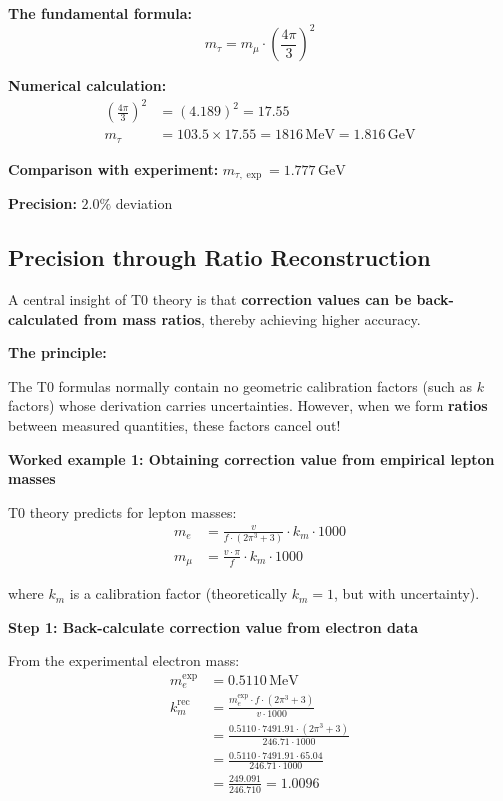 	\textbf{The fundamental formula:}
	\begin{equation}
		\boxed{m_\tau = m_\mu \cdot \left(\frac{4\pi}{3}\right)^2}
	\end{equation}
	
	\textbf{Numerical calculation:}
	\begin{align}
		\left(\frac{4\pi}{3}\right)^2 &= (4.189)^2 = 17.55 \\
		m_\tau &= 103.5 \times 17.55 = 1816\,\text{MeV} = 1.816\,\text{GeV}
	\end{align}
	
	\textbf{Comparison with experiment:} \(m_{\tau,\exp} = 1.777\,\text{GeV}\)
	
	\textbf{Precision:} \(2.0\%\) deviation
	
	\subsection{Precision through Ratio Reconstruction}
	
	A central insight of T0 theory is that \textbf{correction values can be back-calculated from mass ratios}, thereby achieving higher accuracy.
	
	\textbf{The principle:}
	
	The T0 formulas normally contain no geometric calibration factors (such as \(k\) factors) whose derivation carries uncertainties. However, when we form \textbf{ratios} between measured quantities, these factors cancel out!
	
	\textbf{Worked example 1: Obtaining correction value from empirical lepton masses}
	
	T0 theory predicts for lepton masses:
	\begin{align}
		m_e &= \frac{v}{f \cdot (2\pi^3 + 3)} \cdot k_m \cdot 1000 \\
		m_\mu &= \frac{v \cdot \pi}{f} \cdot k_m \cdot 1000
	\end{align}
	
	where \(k_m\) is a calibration factor (theoretically \(k_m = 1\), but with uncertainty).
	
	\textbf{Step 1: Back-calculate correction value from electron data}
	
	From the experimental electron mass:
	\begin{align}
		m_e^{\exp} &= 0.5110\,\text{MeV} \\
		k_m^{\text{rec}} &= \frac{m_e^{\exp} \cdot f \cdot (2\pi^3 + 3)}{v \cdot 1000} \\
		&= \frac{0.5110 \cdot 7491.91 \cdot (2\pi^3 + 3)}{246.71 \cdot 1000} \\
		&= \frac{0.5110 \cdot 7491.91 \cdot 65.04}{246.71 \cdot 1000} \\
		&= \frac{249.091}{246.710} = 1.0096
	\end{align}
	
